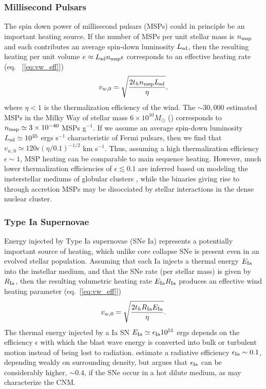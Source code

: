 \documentclass[usenatbib,fleqn]{mn2e}
\newcommand{\vwO}{v_{w,0}}
\begin{document}
\subsubsection{Millisecond Pulsars} The spin down power of millisecond pulsars (MSPs) could in principle be an important heating source.  If the number of MSPs per unit stellar mass is $n_{\rm msp}$ and each contributes an average spin-down luminosity $L_{\rm sd}$, then the resulting heating per unit volume $e \approx L_{\rm sd}n_{\rm msp}\epsilon$ corresponds to an effective heating rate (eq.~ [\ref{eq:vw_eff}])
  \begin{align}
    \vwO=\sqrt{\frac{2 t_h n_{\rm msp} L_{\rm sd}}{\eta}},
  \end{align}
where $\eta < 1$ is the thermalization efficiency of the wind.  The $\sim 30,000$ estimated MSPs in the Milky Way of stellar mass $6\times 10^{10}M_{\odot}$ (\citealt{Lorimer13}) corresponds to $n_{\rm msp}\simeq3 \times 10^{-40} $ MSPs g$^{-1}$.  If we assume an average spin-down luminosity $L_{\rm sd}\simeq 10^{35}$ ergs s$^{-1}$ characteristic of Fermi pulsars, then we find that $\vwO\simeq 120\epsilon (\eta/0.1)^{-1/2}$ km s$^{-1}$.  Thus, assuming a high thermalization efficiency $\epsilon \sim 1$, MSP heating can be comparable to main sequence heating.  However, much lower thermalization efficiencies of $\epsilon \lesssim 0.1$ are inferred based on modeling the insterstellar mediums of globular clusters \citep{NaimanSoares-Furtado+:2013a}, while the binaries giving rise to through accretion MSPs may be disocciated by stellar interactions in the dense nuclear cluster.  
\subsubsection{Type Ia Supernovae} 

Energy injected by Type Ia supernovae (SNe Ia) represents a potentially important source of heating, which unlike core collapse SNe is present even in an evolved stellar population.  Assuming that each Ia injects a thermal energy $E_{\rm Ia}$ into the instellar medium, and that the SNe rate (per stellar mass) is given by $R_{\rm Ia}$, then the resulting volumetric heating rate $E_{\rm Ia}R_{\rm Ia}$ produces an effective wind heating parameter (eq.~[\ref{eq:vw_eff}])
\begin{align}
    \vwO=\sqrt{\frac{2 t_h R_{\rm Ia} E_{\rm Ia}}{\eta}} \label{eq:vw_sne}.
\end{align}
The thermal energy injected by a Ia SN $E_{\rm Ia} \simeq \epsilon_{\rm Ia} 10^{51}$ ergs depends on the efficiency $\epsilon$ with which the blast wave energy is converted into bulk or turbulent motion instead of being lost to radiation.  \cite{Thornton+98} estimate a radiative efficiency $\epsilon_{\rm Ia} \sim 0.1$, depending weakly on surrounding density, but \citet{Sharma+14} argues that $\epsilon_{\rm Ia}$ can be considerably higher, $\sim 0.4$, if the SNe occur in a hot dilute medium, as may characterize the CNM.
\end{document}
